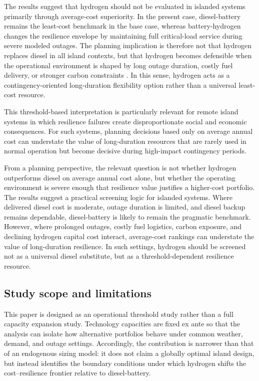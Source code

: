 \documentclass[preprint,12pt]{elsarticle}
\begin{document}
The results suggest that hydrogen should not be evaluated in islanded systems primarily through average-cost superiority. In the present case, diesel-battery remains the least-cost benchmark in the base case, whereas battery-hydrogen changes the resilience envelope by maintaining full critical-load service during severe modeled outages. The planning implication is therefore not that hydrogen replaces diesel in all island contexts, but that hydrogen becomes defensible when the operational environment is shaped by long outage duration, costly fuel delivery, or stronger carbon constraints \cite{tatti_2024_hydrogen_offgrid_case,huang_2023_economic_resilient_h2_microgrid,shahbazbegian_2023_resilience_p2h,staadecker_2024_ldes_value}. In this sense, hydrogen acts as a contingency-oriented long-duration flexibility option rather than a universal least-cost resource.

This threshold-based interpretation is particularly relevant for remote island systems in which resilience failures create disproportionate social and economic consequences. For such systems, planning decisions based only on average annual cost can understate the value of long-duration resources that are rarely used in normal operation but become decisive during high-impact contingency periods.

From a planning perspective, the relevant question is not whether hydrogen outperforms diesel on average annual cost alone, but whether the operating environment is severe enough that resilience value justifies a higher-cost portfolio. The results suggest a practical screening logic for islanded systems. Where delivered diesel cost is moderate, outage duration is limited, and diesel backup remains dependable, diesel-battery is likely to remain the pragmatic benchmark. However, where prolonged outages, costly fuel logistics, carbon exposure, and declining hydrogen capital cost interact, average-cost rankings can understate the value of long-duration resilience. In such settings, hydrogen should be screened not as a universal diesel substitute, but as a threshold-dependent resilience resource.

\subsection{Study scope and limitations}

This paper is designed as an operational threshold study rather than a full capacity expansion study. Technology capacities are fixed ex ante so that the analysis can isolate how alternative portfolios behave under common weather, demand, and outage settings. Accordingly, the contribution is narrower than that of an endogenous sizing model: it does not claim a globally optimal island design, but instead identifies the boundary conditions under which hydrogen shifts the cost--resilience frontier relative to diesel-battery.
\end{document}
